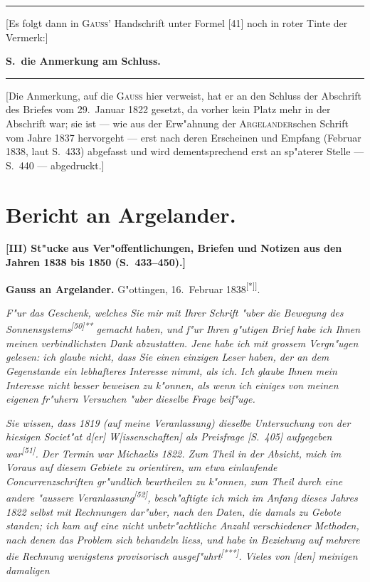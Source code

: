 \documentclass[12pt,a4paper]{article}
\theoremstyle{plain}
\theoremstyle{definition}
\theoremstyle{remark}
\begin{document}
\rule{\textwidth}{0.4pt}
\begin{center}
\small
[Es folgt dann in \textsc{Gauss}' Handschrift unter Formel [41] noch in roter Tinte der Vermerk:]

\textbf{S.\ die Anmerkung am Schluss.}
\end{center}
\rule{\textwidth}{0.4pt}

\begin{center}
\small
[Die Anmerkung, auf die \textsc{Gauss} hier verweist, hat er an den Schluss der Abschrift des Briefes vom 29.\ Januar 1822 gesetzt, da vorher kein Platz mehr in der Abschrift war; sie ist --- wie aus der Erw"ahnung der \textsc{Argelander}schen Schrift vom Jahre 1837 hervorgeht --- erst nach deren Erscheinen und Empfang (Februar 1838, laut S.\ 433) abgefasst und wird dementsprechend erst an sp"aterer Stelle --- S.\ 440 --- abgedruckt.]
\end{center}

\newpage
\section*{Bericht an Argelander.}

\begin{center}
\textbf{[III) St"ucke aus Ver"offentlichungen, Briefen und Notizen aus den Jahren 1838 bis 1850 (S.\ 433--450).]}
\end{center}

\vspace{1em}
\begin{center}
\textbf{Gauss an Argelander.} \quad G"ottingen, 16.\ Februar 1838\textsuperscript{[*]]}.
\end{center}

\noindent
{\itshape F"ur das Geschenk, welches Sie mir mit Ihrer Schrift "uber die Bewegung des Sonnensystems\textsuperscript{[50]**} gemacht haben, und f"ur Ihren g"utigen Brief habe ich Ihnen meinen verbindlichsten Dank abzustatten. Jene habe ich mit grossem Vergn"ugen gelesen: ich glaube nicht, dass Sie einen einzigen Leser haben, der an dem Gegenstande ein lebhafteres Interesse nimmt, als ich. Ich glaube Ihnen mein Interesse nicht besser beweisen zu k"onnen, als wenn ich einiges von meinen eigenen fr"uhern Versuchen "uber dieselbe Frage beif"uge.}

{\itshape Sie wissen, dass 1819 (auf meine Veranlassung) dieselbe Untersuchung von der hiesigen Societ"at d[er] W[issenschaften] als Preisfrage [S.\ 405] aufgegeben war\textsuperscript{[51]}. Der Termin war Michaelis 1822. Zum Theil in der Absicht, mich im Voraus auf diesem Gebiete zu orientiren, um etwa einlaufende Concurrenzschriften gr"undlich beurtheilen zu k"onnen, zum Theil durch eine andere "aussere Veranlassung\textsuperscript{[52]}, besch"aftigte ich mich im Anfang dieses Jahres 1822 selbst mit Rechnungen dar"uber, nach den Daten, die damals zu Gebote standen; ich kam auf eine nicht unbetr"achtliche Anzahl verschiedener Methoden, nach denen das Problem sich behandeln liess, und habe in Beziehung auf mehrere die Rechnung wenigstens provisorisch ausgef"uhrt\textsuperscript{[***]}. Vieles von [den] meinigen damaligen}
\end{document}
